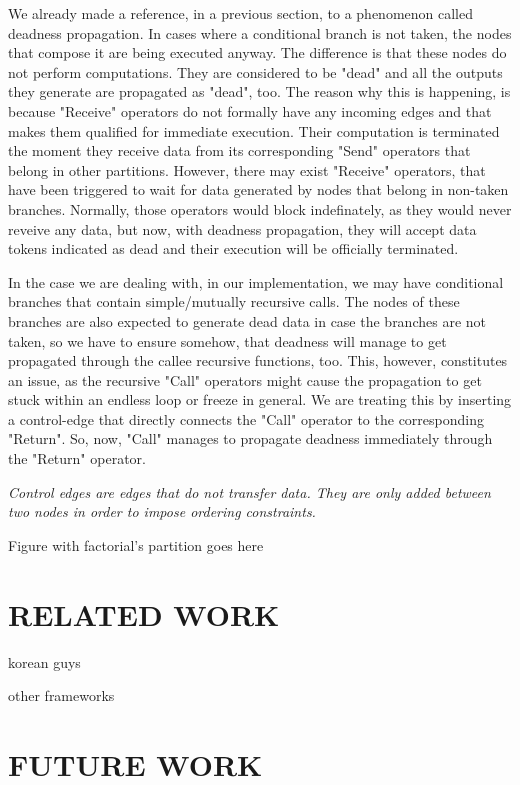 \documentclass[ack,preface]{dithesis}
\begin{document}
We already made a reference, in a previous section, to a phenomenon called deadness propagation. In cases where a conditional branch is not taken, the nodes that compose it are being executed anyway. The difference is that these nodes do not perform computations. They are considered to be "dead" and all the outputs they generate are propagated as "dead", too. 
The reason why this is happening, is  because "Receive" operators do not formally have any incoming edges and that makes them qualified for immediate execution. Their computation is terminated the moment they receive data from its corresponding "Send" operators that belong in other partitions. However, there may exist "Receive" operators, that have been triggered to wait for data generated by nodes that belong in non-taken branches. Normally, those operators would block indefinately, as they would never reveive any data, but now, with deadness propagation, they will accept data tokens indicated as dead and their execution will be officially terminated.

In the case we are dealing with, in our implementation, we may have conditional branches that contain simple/mutually recursive calls. The nodes of these branches are  also expected to generate dead data in case the branches are not taken, so we have to ensure somehow, that deadness will manage to get propagated through the callee recursive functions, too. This, however, constitutes an issue, as the recursive "Call" operators might cause the propagation to get stuck within an endless loop or freeze in general. We are treating this by inserting a control-edge that directly connects  the "Call" operator to the corresponding "Return". So, now, "Call" manages to propagate deadness immediately through the "Return" operator. 

 \textit{Control edges are edges that do not transfer data. They are only added between two nodes in order to impose ordering constraints.}



Figure with factorial's partition goes here

\chapter{RELATED WORK}
 \cite{Jeong:2018}

korean guys

other frameworks

\chapter{FUTURE WORK}
\end{document}
